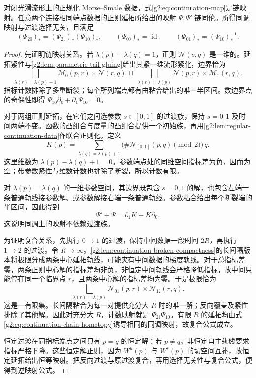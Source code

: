 \begin{theorem}[Morse 延拓]\label{g2:thm:morse-continuation}
	对闭光滑流形上的正规化 Morse--Smale 数据，式\eqref{g2:eq:continuation-map}是链映射。任意两个连接相同端点数据的正则延拓所给出的映射 \(\Psi,\Psi'\) 链同伦。所得同调映射与过渡选择无关，且满足
	\[
		(\Psi_{20})_*=(\Psi_{21})_*(\Psi_{10})_*,
		\qquad(\Psi_{00})_*=\operatorname{id},
		\qquad(\Psi_{01})_*=(\Psi_{10})_*^{-1}.
	\]
\end{theorem}
\begin{proof}
	先证明链映射关系。若 \(\lambda(p)-\lambda(q)=1\)，正则 \(\mathcal N(p,q)\) 是一维的。延拓紧性与\cref{g2:lem:parametric-tail-gluing}给出其紧一维流形紧化，边界恰为
	\[
		\bigsqcup_{\lambda(r)=\lambda(p)-1}
		\mathcal M_0(p,r)\times\mathcal N(r,q)
		\ \sqcup\
		\bigsqcup_{\lambda(r)=\lambda(p)}
		\mathcal N(p,r)\times\mathcal M_1(r,q).
	\]
	指标计数排除了多重断裂；每个所列端点都有由粘合给出的唯一半区间。数边界点的奇偶性即得 \(\Psi_{10}\partial_0+\partial_1\Psi_{10}=0\)。

	对于两组正则延拓，在它们之间选参数 \(s\in[0,1]\) 的过渡族，保持 \(s=0,1\) 及时间两端不变。函数的凸组合与度量的凸组合提供一个初始族，再用\cref{g2:lem:regular-continuation-data}作联合正则化。定义
	\[
		K(p)=\sum_{\lambda(q)=\lambda(p)+1}
		\bigl(\#\mathcal N_{[0,1]}(p,q)\pmod2\bigr)\,q.
	\]
	这里维数为 \(\lambda(p)-\lambda(q)+1=0\)。参数端点处的同维空间指标差为负，因而为空；带参数紧性与维数计数也排除了断裂，所以计数有限。

	对 \(\lambda(p)=\lambda(q)\) 的一维参数空间，其边界既包含 \(s=0,1\) 的解，也包含左端一条普通轨线接参数解、或参数解接右端一条普通轨线。参数粘合给出每个断裂端的半区间，因此得到
	\begin{equation}\label{g2:eq:continuation-chain-homotopy}
		\Psi'+\Psi=\partial_1K+K\partial_0.
	\end{equation}
	这说明同调上的映射不依赖过渡族。

	为证明复合关系，先执行 \(0\to1\) 的过渡，保持中间数据一段时间 \(2R\)，再执行 \(1\to2\) 的过渡。令 \(R\to\infty\)。\cref{g2:lem:continuation-broken-compactness}的长间隔版本将极限分成两条中心延拓轨线，可能夹有中间数据的梯度轨线。对于总指标差零，两条正则中心解的指标差均非负，非恒定中间轨线会严格降低指标，故中间只能停在同一个临界点 \(r\)，且两条中心解的指标差均为零。于是极限恰为
	\[
		\bigsqcup_{\lambda(r)=\lambda(p)}
		\mathcal N_{01}(p,r)\times\mathcal N_{12}(r,q).
	\]
	这是一有限集。长间隔粘合为每一对提供充分大 \(R\) 时的唯一解；反向覆盖及紧性排除了其他解。因此对充分大 \(R\)，计数映射就是 \(\Psi_{21}\Psi_{10}\)。有限 \(R\) 的延拓均由式\eqref{g2:eq:continuation-chain-homotopy}诱导相同的同调映射，故复合公式成立。

	恒定过渡在同指标端点之间只有 \(p=q\) 的恒定解：若 \(p\ne q\)，非恒定自主轨线要求指标严格下降。这些恒定解正则，因为 \(W^u(p)\) 与 \(W^s(p)\) 的切空间互补，故恒定延拓给出恒等映射。把反向过渡与原过渡复合，再用选择无关性与复合公式，便得到逆映射公式。
\end{proof}

